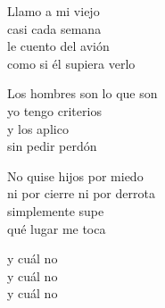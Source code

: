 \begin{lyrics}
Llamo a mi viejo\\
casi cada semana\\
le cuento del avión\\
como si él supiera verlo

Los hombres son lo que son\\
yo tengo criterios\\
y los aplico\\
sin pedir perdón

No quise hijos por miedo\\
ni por cierre ni por derrota\\
simplemente supe\\
qué lugar me toca

y cuál no\\
y cuál no\\
y cuál no
\end{lyrics}

